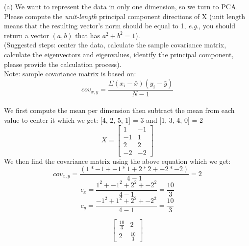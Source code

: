 \documentclass{article}
\begin{document}
\noindent
(a) We want to represent the data in only one dimension, so we turn to PCA. Please compute the \textit{unit-length} principal component directions of X (unit length means that the resulting vector's norm should be equal to 1, \textit{e.g}., you should return a vector $(a, b)$ that has $a^2 + b^2 = 1$).
\\
(Suggested steps: center the data, calculate the sample covariance matrix, calculate the eigenvectors and eigenvalues, identify the principal component, please provide the calculation process).
\\
Note: sample covariance matrix is based on:
\begin{equation*}
    cov_{x,y} = \frac{\Sigma(x_i - \bar{x})(y_i - \bar{y})}{N-1}
\end{equation*}
\\
We first compute the mean per dimension then subtract the mean from each value to center it which we get:
[4, 2, 5, 1] = 3 and [1, 3, 4, 0] = 2
\begin{equation*}
    X = \begin{bmatrix}
        1 & -1 \\
        -1 & 1 \\
        2 & 2 \\
        -2 & -2
    \end{bmatrix}
\end{equation*}
We then find the covariance matrix using the above equation which we get:
\begin{equation*}
    cov_{x,y} = \frac{(1*-1+-1*1+2*2+-2*-2)}{4-1} = 2
\end{equation*}
\begin{equation*}
    c_x = \frac{1^2 + -1^2 + 2^2 + -2^2}{4-1} = \frac{10}{3}
\end{equation*}
\begin{equation*}
    c_y = \frac{-1^2 + 1^2 + 2^2 + -2^2}{4-1} = \frac{10}{3}
\end{equation*}

\begin{equation*}
    \begin{bmatrix}
        \frac{10}{3} & 2 \\
        2 & \frac{10}{3}
    \end{bmatrix}
\end{equation*}
\end{document}
